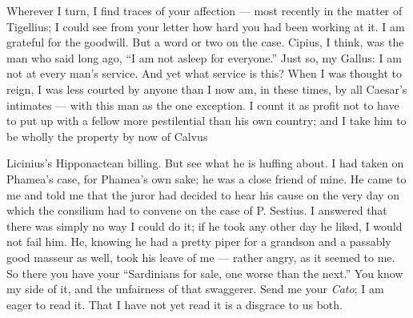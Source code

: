 

 Wherever I turn, I find traces of your affection --- most recently in the matter of Tigellius; I could see from your letter how hard you had been working at it. I am grateful for the goodwill. But a word or two on the case. Cipius, I think, was the man who said long ago, ``I am not asleep for everyone.'' Just so, my Gallus: I am not at every man's service. And yet what service is this? When I was thought to reign, I was less courted by anyone than I now am, in these times, by all Caesar's intimates --- with this man as the one exception. I count it as profit not to have to put up with a fellow more pestilential than his own country; and I take him to be wholly the property by now of Calvus

 Licinius's Hipponactean billing. But see what he is huffing about. I had taken on Phamea's case, for Phamea's own sake; he was a close friend of mine. He came to me and told me that the juror had decided to hear his cause on the very day on which the consilium had to convene on the case of P. Sestius. I answered that there was simply no way I could do it; if he took any other day he liked, I would not fail him. He, knowing he had a pretty piper for a grandson and a passably good masseur as well, took his leave of me --- rather angry, as it seemed to me. So there you have your ``Sardinians for sale, one worse than the next.'' You know my side of it, and the unfairness of that swaggerer. Send me your \textit{Cato}; I am eager to read it. That I have not yet read it is a disgrace to us both.
